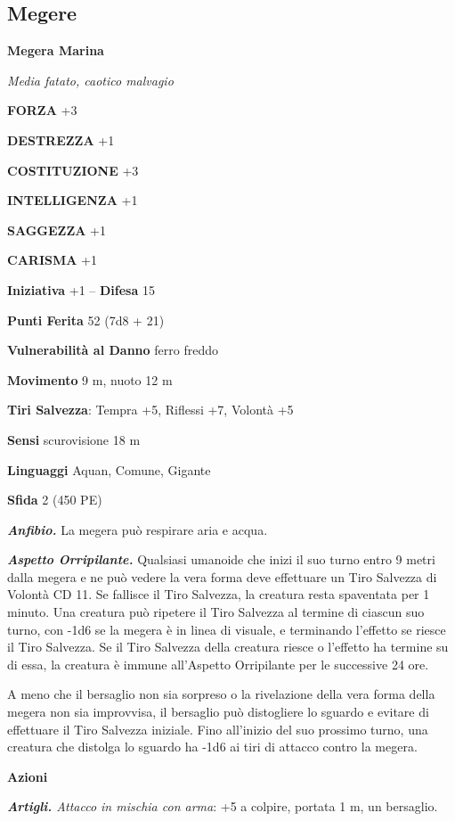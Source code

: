 \begin{multicols}{2}
\subsection{Megere}

\medskip{}\textbf{Megera Marina}

\emph{Media fatato, caotico malvagio}

\textbf{FORZA} +3

\textbf{DESTREZZA} +1

\textbf{COSTITUZIONE} +3

\textbf{INTELLIGENZA} +1

\textbf{SAGGEZZA} +1

\textbf{CARISMA} +1

\textbf{Iniziativa} +1 -- \textbf{Difesa} 15

\textbf{Punti Ferita} 52 (7d8 + 21)

\textbf{Vulnerabilità al Danno} ferro freddo

\textbf{Movimento} 9 m, nuoto 12 m

\textbf{Tiri Salvezza}: Tempra +5, Riflessi +7, Volontà +5

\textbf{Sensi} scurovisione 18 m

\textbf{Linguaggi} Aquan, Comune, Gigante

\textbf{Sfida} 2 (450 PE)

\emph{\textbf{Anfibio.}} La megera può respirare aria e acqua.

\emph{\textbf{Aspetto Orripilante.}} Qualsiasi umanoide che inizi il suo turno entro 9 metri dalla megera e ne può vedere la vera forma deve effettuare un Tiro Salvezza di Volontà CD 11. Se fallisce il Tiro Salvezza, la creatura resta spaventata per 1 minuto. Una creatura può ripetere il Tiro Salvezza al termine di ciascun suo turno, con -1d6 se la megera è in linea di visuale, e terminando l'effetto se riesce il Tiro Salvezza. Se il Tiro Salvezza della creatura riesce o l'effetto ha termine su di essa, la creatura è immune all'Aspetto Orripilante per le successive 24 ore.

A meno che il bersaglio non sia sorpreso o la rivelazione della vera
forma della megera non sia improvvisa, il bersaglio può distogliere lo
sguardo e evitare di effettuare il Tiro Salvezza iniziale. Fino
all'inizio del suo prossimo turno, una creatura che distolga lo sguardo
ha -1d6 ai tiri di attacco contro la megera.

\textbf{Azioni}

\emph{\textbf{Artigli.} Attacco in mischia con arma}: +5 a colpire,
portata 1 m, un bersaglio.


\end{multicols}
